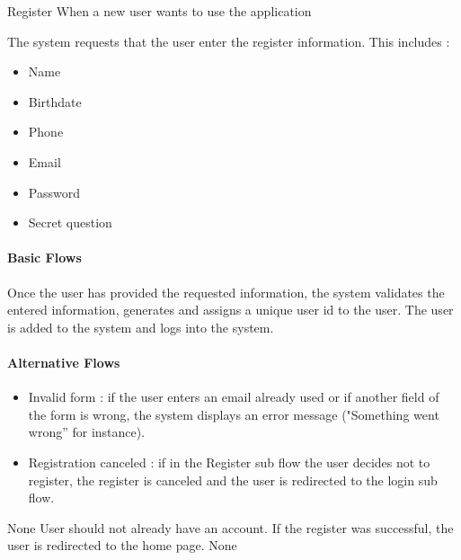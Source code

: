 \usecasedesc
{Register}
{When a new user wants to use the application}
{
  The system requests that the user enter the register information. This includes :
  \begin{itemize}
    \item Name
    \item Birthdate
    \item Phone
    \item Email
    \item Password
    \item Secret question
  \end{itemize}

  \paragraph{Basic Flows}
  Once the user has provided the requested information, the system validates the entered information, generates and assigns a unique user id to the user. The user is added to the system and logs into the system.
  \paragraph{Alternative Flows}
  \begin{itemize}
    \item Invalid form : if the user enters an email already used or if another field of the form is wrong, the system displays an error message ("Something went wrong” for instance).
    \item Registration canceled : if in the Register sub flow the user decides not to register, the register is canceled and the user is redirected to the login sub flow.
  \end{itemize}
}
{None}
{User should not already have an account.}
{If the register was successful, the user is redirected to the home page.}
{None}

